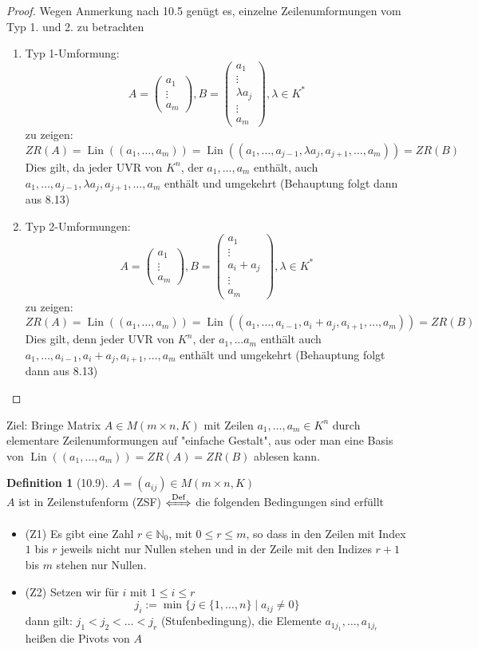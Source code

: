 \documentclass[a4paper]{scrartcl}
\DeclareMathOperator{\Lin}{Lin}
\theoremstyle{definition}
\newtheorem{defn}{Definition}
\theoremstyle{plain}
\theoremstyle{plain}
\theoremstyle{remark}
\theoremstyle{remark}
\theoremstyle{remark}
\theoremstyle{remark}
\theoremstyle{remark}
\begin{document}
\begin{proof}
Wegen Anmerkung nach 10.5 genügt es, einzelne Zeilenumformungen vom Typ 1. und 2. zu betrachten
\begin{enumerate}
\item Typ 1-Umformung:
\[A = \begin{pmatrix} a_1 \\ \vdots \\ a_m \end{pmatrix}, B = \begin{pmatrix} a_1 \\ \vdots \\ \lambda a_j \\ \vdots \\ a_m\end{pmatrix}, \lambda \in K^\ast\]
zu zeigen: \[ZR(A) = \Lin((a_1, \ldots, a_m)) = \Lin((a_1, \ldots, a_{j - 1}, \lambda a_j, a_{j + 1},\ldots, a_m)) = ZR(B)\]
Dies gilt, da jeder UVR von $K^n$, der $a_1, \ldots, a_m$ enthält, auch $a_1, \ldots, a_{j -1}, \lambda a_j, a_{j + 1}, \ldots, a_m$ enthält und umgekehrt (Behauptung folgt dann aus 8.13)
\item Typ 2-Umformungen:
\[A = \begin{pmatrix} a_1 \\ \vdots \\ a_m \end{pmatrix}, B = \begin{pmatrix} a_1 \\ \vdots \\ a_i + a_j \\ \vdots \\ a_m\end{pmatrix}, \lambda \in K^\ast\]
zu zeigen:
\[ZR(A) = \Lin((a_1, \ldots, a_m)) = \Lin((a_1, \ldots, a_{i - 1}, a_i + a_j, a_{i + 1}, \ldots, a_m)) = ZR(B)\]
Dies gilt, denn jeder UVR von $K^n$, der $a_1, \ldots a_m$ enthält auch $a_1, \ldots, a_{i - 1}, a_i + a_j, a_{i + 1}, \ldots, a_m$ enthält und umgekehrt (Behauptung folgt dann aus 8.13)
\end{enumerate}
\end{proof}
Ziel: Bringe Matrix $A \in M(m\times n, K)$ mit Zeilen $a_1, \ldots, a_m \in K^n$ durch elementare Zeilenumformungen auf "einfache Gestalt", aus oder man eine Basis von $\Lin((a_1, \dots, a_m)) = ZR(A) = ZR(B)$
ablesen kann.
\begin{defn}[10.9]
$A = (a_{ij}) \in M(m\times n, K)$ \\
  $A$ ist in Zeilenstufenform (ZSF) $\xLeftrightarrow{\text{Def}}$ die folgenden Bedingungen sind erfüllt
\begin{itemize}
\item (Z1) Es gibt eine Zahl $r\in\mathbb{N}_0$, mit $0\leq r \leq m$, so dass in den Zeilen mit Index $1$ bis $r$ jeweils nicht nur Nullen stehen und in der Zeile mit den Indizes $r + 1$ bis $m$ stehen nur Nullen.
\item (Z2) Setzen wir für $i$ mit $1 \leq i \leq r$
    \[j_{i} := \min\{j\in \{1, \ldots, n\} \mid a_{ij} \neq 0\}\]
    dann gilt: $j_1 < j_2 < \ldots < j_r$ (Stufenbedingung), die Elemente $a_{1j_1}, \ldots, a_{1j_r}$ heißen die Pivots von $A$
\end{itemize}
\end{defn}
\end{document}

